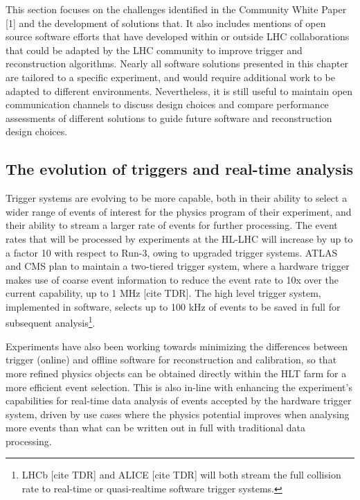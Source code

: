 \documentclass[10pt,a4paper]{article}
\begin{document}
This section focuses on the challenges identified in the Community White
Paper {[}1{]} and the development of solutions that. It also includes
mentions of open source software efforts that have developed within or
outside LHC collaborations that could be adapted by the LHC community to
improve trigger and reconstruction algorithms. Nearly all software
solutions presented in this chapter are tailored to a specific
experiment, and would require additional work to be adapted to different
environments. Nevertheless, it is still useful to maintain open
communication channels to discuss design choices and compare performance
assessments of different solutions to guide future software and
reconstruction design choices.

\hypertarget{the-evolution-of-triggers-and-real-time-analysis}{%
\subsection{\texorpdfstring{The evolution of triggers and real-time
analysis
}{The evolution of triggers and real-time analysis }}\label{the-evolution-of-triggers-and-real-time-analysis}}

Trigger systems are evolving to be more capable, both in their ability
to select a wider range of events of interest for the physics program of
their experiment, and their ability to stream a larger rate of events
for further processing. The event rates that will be processed by
experiments at the HL-LHC will increase by up to a factor 10 with
respect to Run-3, owing to upgraded trigger systems. ATLAS and CMS plan
to maintain a two-tiered trigger system, where a hardware trigger makes
use of coarse event information to reduce the event rate to 10x over the
current capability, up to 1 MHz {[}cite TDR{]}. The high level trigger
system, implemented in software, selects up to 100 kHz of events to be
saved in full for subsequent analysis\footnote{LHCb {[}cite TDR{]} and
  ALICE {[}cite TDR{]} will both stream the full collision rate to
  real-time or quasi-realtime software trigger systems.}.

Experiments have also been working towards minimizing the differences
between trigger (online) and offline software for reconstruction and
calibration, so that more refined physics objects can be obtained
directly within the HLT farm for a more efficient event selection. This
is also in-line with enhancing the experiment's capabilities for
real-time data analysis of events accepted by the hardware trigger
system, driven by use cases where the physics potential improves when
analysing more events than what can be written out in full with
traditional data processing.
\end{document}

